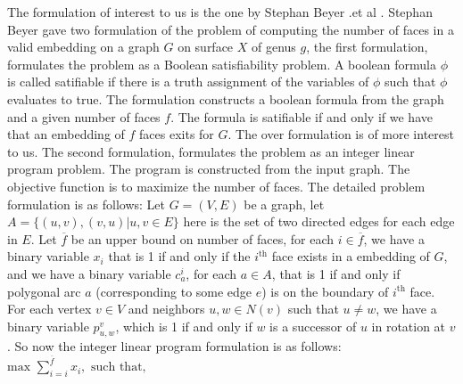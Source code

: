 \documentclass{article}
\begin{document}
    The formulation of interest to us is the one by Stephan Beyer .et al \cite{Beyer16}. Stephan Beyer gave two formulation of the problem of computing the number of faces in a valid embedding on a graph $G$ on surface $X$ of genus $g$, the first formulation, formulates the problem as a Boolean satisfiability problem.
    A boolean formula $\phi$ is called satifiable if there is a truth assignment of the variables of $\phi$ such that $\phi$ evaluates to true.
    The formulation constructs a boolean formula from the graph and a given number of faces $f$. The formula is satifiable if and only if we have that an embedding of $f$ faces exits for $G$. The over formulation is of more interest to us. 
    The second formulation, formulates the problem as an integer linear program problem. The program is constructed from the input graph.
    The objective function is to maximize the number of faces. The detailed problem formulation is as follows:
    Let $G = (V, E)$ be a graph, let $A = \{(u, v), (v, u) | {u,v} \in E\}$ here is the set of two directed edges for each edge in $E$.
    Let $\overline{f}$ be an upper bound on number of faces, for each $i \in \overline{f}$, we have a binary variable $x_i$ that is
    1 if and only if the $i^{\text{th}}$ face exists in a embedding of $G$, and we have a binary variable $c_a^i$, for each $a \in A$, that is 1
    if and only if polygonal arc $a$ (corresponding to some edge $e$) is on the boundary of $i^{\text{th}}$ face. 
    For each vertex $v \in V$ and neighbors $u, w \in N(v)$ such that $u \neq w$, we have a binary variable $p^v_{u,w}$, which is 1 if and only if $w$ is a successor of $u$ in rotation at $v$. So now the integer linear program formulation is as follows:
    \\$\displaystyle{\text{max } \sum^{\overline{f}}_{i = i} x_i, \text{ such that,}}$
\end{document}
